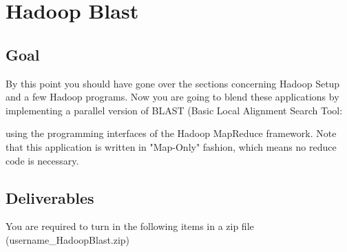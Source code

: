 \section*{Hadoop Blast}
\subsection*{Goal}
 
By this point you should have gone over the sections concerning Hadoop Setup
and a few Hadoop programs. Now you are going to blend these applications by
implementing a parallel version of BLAST (Basic Local Alignment Search Tool:


using the programming
interfaces of the Hadoop MapReduce framework. Note that this application is
written in "Map-Only" fashion, which means no reduce code is necessary.

\subsection*{Deliverables} 

You are required to turn in the following items in a zip file
(username\_HadoopBlast.zip)

